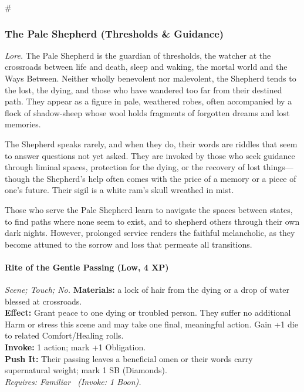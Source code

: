 # %

\subsubsection{The Pale Shepherd (Thresholds \& Guidance)}
\textit{Lore.} The Pale Shepherd is the guardian of thresholds, the watcher at the crossroads between life and death, sleep and waking, the mortal world and the Ways Between. Neither wholly benevolent nor malevolent, the Shepherd tends to the lost, the dying, and those who have wandered too far from their destined path. They appear as a figure in pale, weathered robes, often accompanied by a flock of shadow-sheep whose wool holds fragments of forgotten dreams and lost memories.

The Shepherd speaks rarely, and when they do, their words are riddles that seem to answer questions not yet asked. They are invoked by those who seek guidance through liminal spaces, protection for the dying, or the recovery of lost things—though the Shepherd's help often comes with the price of a memory or a piece of one's future. Their sigil is a white ram's skull wreathed in mist.

Those who serve the Pale Shepherd learn to navigate the spaces between states, to find paths where none seem to exist, and to shepherd others through their own dark nights. However, prolonged service renders the faithful melancholic, as they become attuned to the sorrow and loss that permeate all transitions.

\paragraph*{Rite of the Gentle Passing (Low, 4 XP)} \emph{Scene; Touch; No.}
\textbf{Materials:} a lock of hair from the dying or a drop of water blessed at crossroads.\\
\textbf{Effect:} Grant peace to one dying or troubled person. They suffer no additional Harm or stress this scene and may take one final, meaningful action. Gain +1 die to related Comfort/Healing rolls.\\
\textbf{Invoke:} 1 action; mark +1 Obligation.\\
\textbf{Push It:} Their passing leaves a beneficial omen or their words carry supernatural weight; mark 1 SB (Diamonds).\\
\emph{Requires: Familiar \ (\textit{Invoke:} 1 Boon).}

